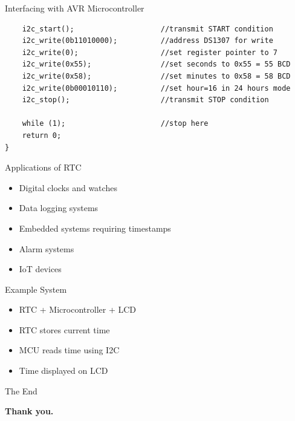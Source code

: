 \documentclass[11pt]{beamer}
\begin{document}
\begin{frame}{Interfacing with AVR Microcontroller}
\begin{verbatim}
    i2c_start();                    //transmit START condition
    i2c_write(0b11010000);          //address DS1307 for write
    i2c_write(0);                   //set register pointer to 7
    i2c_write(0x55);                //set seconds to 0x55 = 55 BCD
    i2c_write(0x58);                //set minutes to 0x58 = 58 BCD
    i2c_write(0b00010110);          //set hour=16 in 24 hours mode
    i2c_stop();                     //transmit STOP condition

    while (1);                      //stop here
    return 0;
}
        \end{verbatim}
    \end{frame}

    \begin{frame}{Applications of RTC}
        \begin{itemize}
            \item Digital clocks and watches
            \item Data logging systems
            \item Embedded systems requiring timestamps
            \item Alarm systems
            \item IoT devices
        \end{itemize}
    \end{frame}

    \begin{frame}{Example System}
        \begin{itemize}
            \item RTC + Microcontroller + LCD
            \item RTC stores current time
            \item MCU reads time using I2C
            \item Time displayed on LCD
        \end{itemize}
    \end{frame}

    \begin{frame}{The End}
        \begin{center}
            \textbf{\Huge Thank you.}
        \end{center}
    \end{frame}
\end{document}
